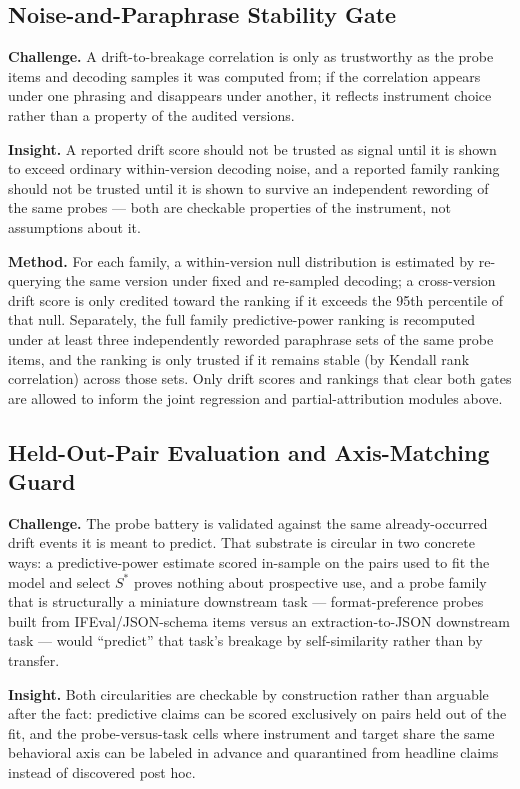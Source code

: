 \documentclass[11pt]{article}
\begin{document}
\subsection{Noise-and-Paraphrase Stability Gate}
\textbf{Challenge.} A drift-to-breakage correlation is only as trustworthy as the probe items and decoding samples it was computed from; if the correlation appears under one phrasing and disappears under another, it reflects instrument choice rather than a property of the audited versions.

\textbf{Insight.} A reported drift score should not be trusted as signal until it is shown to exceed ordinary within-version decoding noise, and a reported family ranking should not be trusted until it is shown to survive an independent rewording of the same probes --- both are checkable properties of the instrument, not assumptions about it.

\textbf{Method.} For each family, a within-version null distribution is estimated by re-querying the same version under fixed and re-sampled decoding; a cross-version drift score is only credited toward the ranking if it exceeds the 95th percentile of that null. Separately, the full family predictive-power ranking is recomputed under at least three independently reworded paraphrase sets of the same probe items, and the ranking is only trusted if it remains stable (by Kendall rank correlation) across those sets. Only drift scores and rankings that clear both gates are allowed to inform the joint regression and partial-attribution modules above.

\subsection{Held-Out-Pair Evaluation and Axis-Matching Guard}
\textbf{Challenge.} The probe battery is validated against the same already-occurred drift events it is meant to predict. That substrate is circular in two concrete ways: a predictive-power estimate scored in-sample on the pairs used to fit the model and select $S^*$ proves nothing about prospective use, and a probe family that is structurally a miniature downstream task --- format-preference probes built from IFEval/JSON-schema items versus an extraction-to-JSON downstream task --- would ``predict'' that task's breakage by self-similarity rather than by transfer.

\textbf{Insight.} Both circularities are checkable by construction rather than arguable after the fact: predictive claims can be scored exclusively on pairs held out of the fit, and the probe-versus-task cells where instrument and target share the same behavioral axis can be labeled in advance and quarantined from headline claims instead of discovered post hoc.
\end{document}
